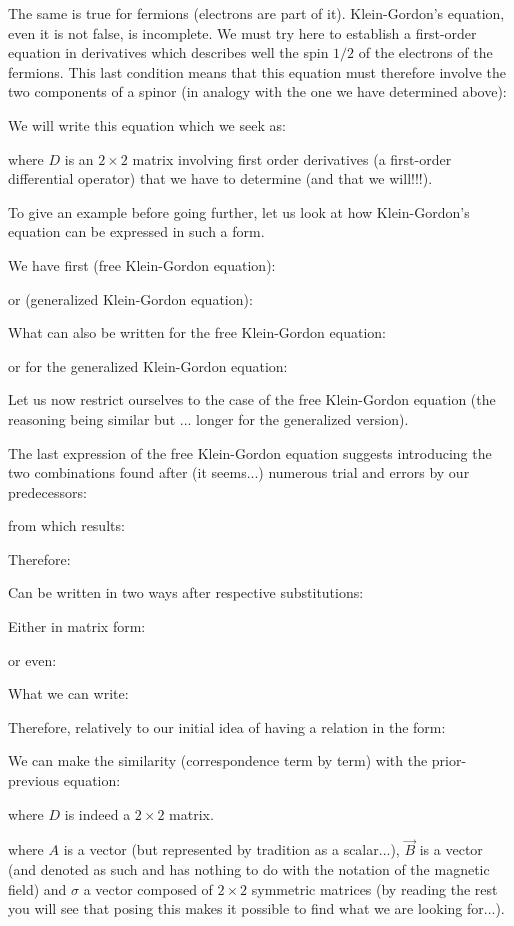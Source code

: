 	The same is true for fermions (electrons are part of it). Klein-Gordon's equation, even it is not false, is incomplete. We must try here to establish a first-order equation in derivatives which describes well the spin $1/2$ of the electrons of the fermions. This last condition means that this equation must therefore involve the two components of a spinor (in analogy with the one we have determined above):
	
	We will write this equation which we seek as:
	
	where $D$ is an $2\times 2$ matrix involving first order derivatives (a first-order differential operator) that we have to determine (and that we will!!!).

	To give an example before going further, let us look at how Klein-Gordon's equation can be expressed in such a form.

	We have first (free Klein-Gordon equation):
	
	or (generalized Klein-Gordon equation):
	
	What can also be written for the free Klein-Gordon equation:
	
	or for the generalized Klein-Gordon equation:
	
	Let us now restrict ourselves to the case of the free Klein-Gordon equation (the reasoning being similar but ... longer for the generalized version).

	The last expression of the free Klein-Gordon equation suggests introducing the two combinations found after (it seems...) numerous trial and errors by our predecessors:
	
	from which results:
	
	Therefore:
	
	Can be written in two ways after respective substitutions:
	
	Either in matrix form:
	
	or even:
	
	What we can write:
	
	Therefore, relatively to our initial idea of having a relation in the form:
	
	We can make the similarity (correspondence term by term) with the prior-previous equation:
	
	where $D$ is indeed a $2\times 2$ matrix.
	
	where $A$ is a vector (but represented by tradition as a scalar...), $\vec{B}$ is a vector (and denoted as such and has nothing to do with the notation of the magnetic field) and $\sigma$ a vector composed of $2\times 2$ symmetric matrices (by reading the rest you will see that posing this makes it possible to find what we are looking for...).

